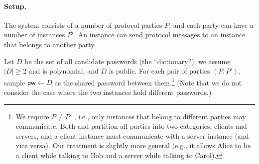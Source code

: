 \documentclass{article}
\newcommand{\pw}{\mathsf{pw}}
\begin{document}
\paragraph{Setup.}
The system consists of a number of protocol parties $P$, and each party can have a number of instances $P^i$. An instance can send protocol messages to an instance that belongs to another party.

Let $D$ be the set of all candidate passwords (the ``dictionary''); we assume $|D| \geq 2$ and is polynomial, and $D$ is public. For each pair of parties $(P, P')$, sample $\pw \gets D$ as the shared password between them.\footnote{We require $P \neq P'$ , i.e., only instances that belong to different parties may communicate. Both \cite{EC:BelPoiRog00} and \cite{JACM:KatOstYun09} partition all parties into two categories, clients and servers, and a client instance must communicate with a server instance (and vice versa). Our treatment is slightly more general (e.g., it allows Alice to be a client while talking to Bob and a server while talking to Carol).} (Note that we do not consider the case where the two instances hold different passwords.)
\end{document}

